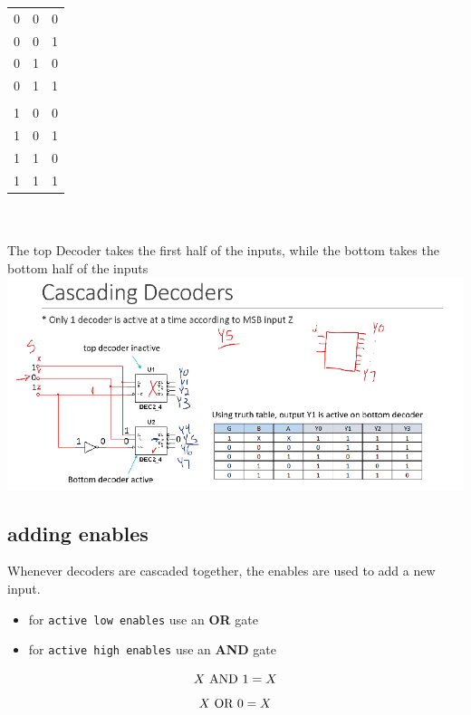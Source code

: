 \documentclass[a4paper,12pt]{article}
\begin{document}
            
            \begin{tabular}{ c c c } 
                \hline
                0 & 0 & 0 \\ 
                0 & 0 & 1 \\ 
                0 & 1 & 0 \\
                0 & 1 & 1 \\
                \underbar{~~~}&\underbar{~~~}&\underbar{~~~} \\
                1 & 0 & 0 \\
                1 & 0 & 1 \\
                1 & 1 & 0 \\
                1 & 1 & 1 \\
                \end{tabular}\\ \\
                The top Decoder takes the first half of the inputs, while the bottom takes the bottom half of the inputs
                \\ \includegraphics*[width=15cm]{CascadingDecoder2.png}

                \subsection{adding enables}
                  Whenever decoders are cascaded together, the enables are used to add a new input.
                  \begin{itemize}
                    \item for \texttt{active low enables} use an \textbf{OR} gate
                    \item for \texttt{active high enables} use an \textbf{AND} gate
                  \end{itemize}
                  \[X~\textnormal{AND}~1=X\] \[X~\textnormal{OR}~0=X\]
                  
\end{document}
